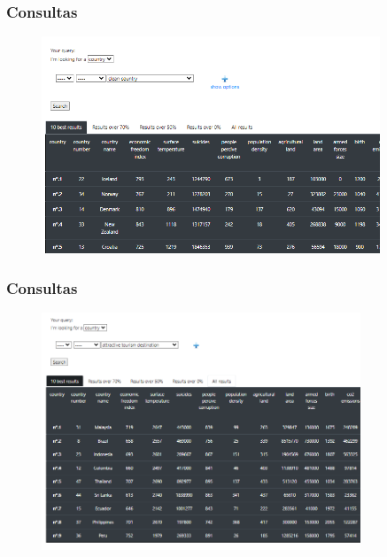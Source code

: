 \documentclass{beamer}
\newcommand{\slideauthor}[1]{\gdef\insertslideauthor{#1}}
\newcommand{\insertslideauthor}{}
\begin{document}
\begin{frame}
\frametitle{Consultas}
\slideauthor{Javier Comyn}
\begin{figure}
\includegraphics[width=0.9\textwidth]{Images/clean_countries.png} 
\end{figure}
\end{frame}

\begin{frame}
\frametitle{Consultas}
\slideauthor{Javier Comyn}
\begin{figure}
\includegraphics[width=0.85\textwidth]{Images/tourism destinations.png} 
\end{figure}
\end{frame}
\end{document}
